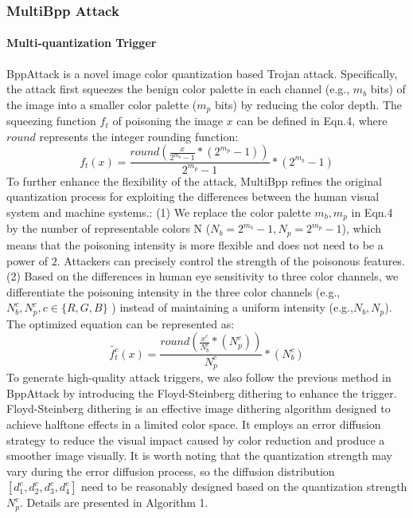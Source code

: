 \documentclass{article}
\begin{document}
\subsubsection{MultiBpp Attack}
\paragraph{Multi-quantization Trigger}
BppAttack is a novel image color quantization based Trojan attack. Specifically, the attack first squeezes the benign color palette in each channel (e.g., \(m_b\) bits) of the image into a smaller color palette (\(m_p\) bits) by reducing the color depth. The squeezing function \(f_t\) of poisoning the image \(x\) can be defined in Eqn.4, where \(round\) represents the integer rounding function:
\begin{equation}
f_t(x) = \frac{round(\frac{x}{2^{m_b}-1}*(2^{m_p}-1))}{2^{m_p}-1} * (2^{m_b}-1)
\end{equation}
To further enhance the flexibility of the attack, MultiBpp refines the original quantization process for exploiting the differences between the human visual system and machine systems.: (1) We replace the color palette \(m_b, m_p\) in Eqn.4 by the number of representable colors N (\(N_b = 2^{m_b}-1, N_p=2^{m_p} - 1\)), which means that the poisoning intensity is more flexible and does not need to be a power of \(2\). Attackers can precisely control the strength of the poisonous features. (2) Based on the differences in human eye sensitivity to three color channels, we differentiate the poisoning intensity in the three color channels (e.g.,\(N_b^c, N_p^c, c \in \{R,G,B\}\) ) instead of maintaining a uniform intensity (e.g.,\(N_b,N_p\)). The optimized equation can be represented as:
\begin{equation}
\tilde{f_t^{c}}(x)= \frac{round(\frac{x^c}{N_b^c}*(N_p^c))}{N_p^c} * (N_b^c)
\end{equation}
To generate high-quality attack triggers, we also follow the previous method in BppAttack by introducing the Floyd-Steinberg dithering to enhance the trigger. Floyd-Steinberg dithering is an effective image dithering algorithm designed to achieve halftone effects in a limited color space. It employs an error diffusion strategy to reduce the visual impact caused by color reduction and produce a smoother image visually. It is worth noting that the quantization strength may vary during the error diffusion process, so the diffusion distribution \([d_1^c,d_2^c,d_3^c,d_4^c]\) need to be reasonably designed based on the quantization strength \(N_p^c\). Details are presented in Algorithm 1.
\end{document}

